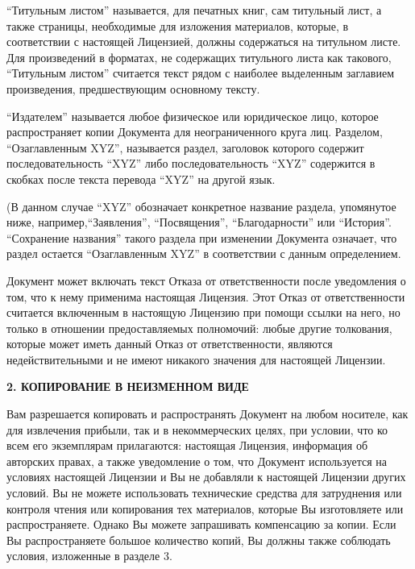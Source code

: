\enquote{Титульным листом} называется, для печатных книг, сам
титульный лист, а также страницы, необходимые для изложения
материалов, которые, в соответствии с настоящей Лицензией, должны
содержаться на титульном листе. Для произведений в форматах, не
содержащих титульного листа как такового, \enquote{Титульным листом}
считается текст рядом с наиболее выделенным заглавием произведения,
предшествующим основному тексту.

\enquote{Издателем} называется любое физическое или юридическое лицо,
которое распространяет копии Документа для неограниченного круга
лиц. Разделом, \enquote{Озаглавленным XYZ}, называется раздел,
заголовок которого содержит последовательность \enquote{XYZ} либо
последовательность \enquote{XYZ} содержится в скобках после текста
перевода \enquote{XYZ} на другой язык.

(В данном случае \enquote{XYZ} обозначает конкретное название раздела,
упомянутое ниже, например,\enquote{Заявления}, \enquote{Посвящения},
\enquote{Благодарности} или \enquote{История}. \enquote{Сохранение
  названия} такого раздела при изменении Документа означает, что
раздел остается \enquote{Озаглавленным XYZ} в соответствии с данным
определением.

Документ может включать текст Отказа от ответственности после
уведомления о том, что к нему применима настоящая Лицензия. Этот Отказ
от ответственности считается включенным в настоящую Лицензию при
помощи ссылки на него, но только в отношении предоставляемых
полномочий: любые другие толкования, которые может иметь данный Отказ
от ответственности, являются недействительными и не имеют никакого
значения для настоящей Лицензии.


\begin{center}
{\Large\bf 2. КОПИРОВАНИЕ В НЕИЗМЕННОМ ВИДЕ\par}
\end{center}

Вам разрешается копировать и распространять Документ на любом
носителе, как для извлечения прибыли, так и в некоммерческих целях,
при условии, что ко всем его экземплярам прилагаются: настоящая
Лицензия, информация об авторских правах, а также уведомление о том,
что Документ используется на условиях настоящей Лицензии
и Вы не добавляли к настоящей Лицензии других условий. Вы не можете
использовать технические средства для затруднения или контроля чтения
или копирования тех материалов, которые Вы изготовляете или
распространяете. Однако Вы можете запрашивать компенсацию за
копии. Если Вы распространяете большое количество копий, Вы должны
также соблюдать условия, изложенные в разделе 3.

